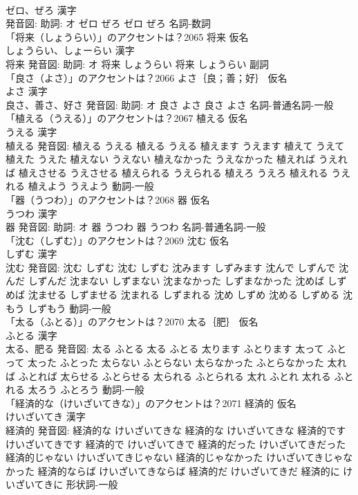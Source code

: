 \documentclass[8pt]{extreport}
\begin{document}
\begin{CJK}{UTF8}{min}
\\	ゼロ、ぜろ 漢字　
\\	発音図: 助詞: オ	ゼロ ぜろ		ゼロ ぜろ				名詞-数詞 
\\	「将来（しょうらい）」のアクセントは？2065	将来 仮名　
\\	しょうらい、しょーらい 漢字　
\\	将来 発音図: 助詞: オ	将来 しょうらい		将来 しょうらい				副詞 
\\	「良さ（よさ）」のアクセントは？2066	よさ｛良；善；好｝ 仮名　
\\	よさ 漢字　
\\	良さ、善さ、好さ 発音図: 助詞: オ	良さ よさ		良さ よさ				名詞-普通名詞-一般 
\\	「植える（うえる）」のアクセントは？2067	植える 仮名　
\\	うえる 漢字　
\\	植える 発音図:	植える うえる		植える うえる 植えます うえます 植えて うえて 植えた うえた 植えない うえない 植えなかった うえなかった 植えれば うえれば 植えさせる うえさせる 植えられる うえられる 植えろ うえろ 植えれる うえれる 植えよう うえよう				動詞-一般 
\\	「器（うつわ）」のアクセントは？2068	器 仮名　
\\	うつわ 漢字　
\\	器 発音図: 助詞: オ	器 うつわ		器 うつわ				名詞-普通名詞-一般 
\\	「沈む（しずむ）」のアクセントは？2069	沈む 仮名　
\\	しずむ 漢字　
\\	沈む 発音図:	沈む しずむ		沈む しずむ 沈みます しずみます 沈んで しずんで 沈んだ しずんだ 沈まない しずまない 沈まなかった しずまなかった 沈めば しずめば 沈ませる しずませる 沈まれる しずまれる 沈め しずめ 沈める しずめる 沈もう しずもう				動詞-一般 
\\	「太る（ふとる）」のアクセントは？2070	太る｛肥｝ 仮名　
\\	ふとる 漢字　
\\	太る、肥る 発音図:	太る ふとる		太る ふとる 太ります ふとります 太って ふとって 太った ふとった 太らない ふとらない 太らなかった ふとらなかった 太れば ふとれば 太らせる ふとらせる 太られる ふとられる 太れ ふとれ 太れる ふとれる 太ろう ふとろう				動詞-一般 
\\	「経済的な（けいざいてきな）」のアクセントは？2071	経済的 仮名　
\\	けいざいてき 漢字　
\\	経済的 発音図:	経済的な けいざいてきな		経済的な けいざいてきな 経済的です けいざいてきです 経済的で けいざいてきで 経済的だった けいざいてきだった 経済的じゃない けいざいてきじゃない 経済的じゃなかった けいざいてきじゃなかった 経済的ならば けいざいてきならば 経済的だ けいざいてきだ 経済的に けいざいてきに				形状詞-一般 

\end{CJK}
\end{document}
